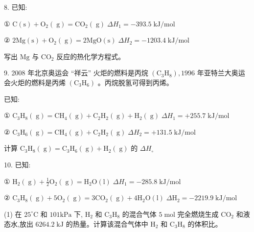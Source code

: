 \documentclass[10pt]{article}
\begin{document}
8. 已知:

① \(\mathrm{C}\left( \mathrm{s}\right) + {\mathrm{O}}_{2}\left( \mathrm{\;g}\right) = {\mathrm{{CO}}}_{2}\left( \mathrm{\;g}\right) \;\Delta {H}_{1} = - {393.5}\mathrm{\;{kJ}}/\mathrm{{mol}}\)

② \(2\mathrm{{Mg}}\left( \mathrm{s}\right) + {\mathrm{O}}_{2}\left( \mathrm{\;g}\right) = 2\mathrm{{MgO}}\left( \mathrm{s}\right) \;\Delta {H}_{2} = - {1203.4}\mathrm{\;{kJ}}/\mathrm{{mol}}\)

写出 \(\mathrm{{Mg}}\) 与 \({\mathrm{{CO}}}_{2}\) 反应的热化学方程式。

9. 2008 年北京奥运会 “祥云” 火炬的燃料是丙烷 \(\left( {{\mathrm{C}}_{3}{\mathrm{H}}_{8}}\right) ,{1996}\) 年亚特兰大奥运会火炬的燃料是丙烯 \(\left( {{\mathrm{C}}_{3}{\mathrm{H}}_{6}}\right)\) 。丙烷脱氢可得到丙烯。

已知:

① \({\mathrm{C}}_{3}{\mathrm{H}}_{8}\left( \mathrm{\;g}\right) = {\mathrm{{CH}}}_{4}\left( \mathrm{\;g}\right) + {\mathrm{C}}_{2}{\mathrm{H}}_{2}\left( \mathrm{\;g}\right) + {\mathrm{H}}_{2}\left( \mathrm{\;g}\right) \;\Delta {H}_{1} = + {255.7}\mathrm{\;{kJ}}/\mathrm{{mol}}\)

② \({\mathrm{C}}_{3}{\mathrm{H}}_{6}\left( \mathrm{\;g}\right) = {\mathrm{{CH}}}_{4}\left( \mathrm{\;g}\right) + {\mathrm{C}}_{2}{\mathrm{H}}_{2}\left( \mathrm{\;g}\right) \;\Delta {H}_{2} = + {131.5}\mathrm{\;{kJ}}/\mathrm{{mol}}\)

计算 \({\mathrm{C}}_{3}{\mathrm{H}}_{8}\left( \mathrm{\;g}\right) = {\mathrm{C}}_{3}{\mathrm{H}}_{6}\left( \mathrm{\;g}\right) + {\mathrm{H}}_{2}\left( \mathrm{\;g}\right)\) 的 \(\Delta {H}_{ \circ }\)

10. 已知:

① \({\mathrm{H}}_{2}\left( \mathrm{\;g}\right) + \frac{1}{2}{\mathrm{O}}_{2}\left( \mathrm{\;g}\right) = {\mathrm{H}}_{2}\mathrm{O}\left( \mathrm{l}\right) \;\Delta {H}_{1} = - {285.8}\mathrm{\;{kJ}}/\mathrm{{mol}}\)

② \({\mathrm{C}}_{3}{\mathrm{H}}_{8}\left( \mathrm{\;g}\right) + 5{\mathrm{O}}_{2}\left( \mathrm{\;g}\right) = 3{\mathrm{{CO}}}_{2}\left( \mathrm{\;g}\right) + 4{\mathrm{H}}_{2}\mathrm{O}\left( \mathrm{l}\right) \;\Delta {\mathrm{H}}_{2} = - {2219.9}\mathrm{\;{kJ}}/\mathrm{{mol}}\)

(1) 在 \({25}^{ \circ }\mathrm{C}\) 和 \({101}\mathrm{{kPa}}\) 下, \({\mathrm{H}}_{2}\) 和 \({\mathrm{C}}_{3}{\mathrm{H}}_{8}\) 的混合气体 \(5\mathrm{\;{mol}}\) 完全燃烧生成 \({\mathrm{{CO}}}_{2}\) 和液态水,放出 \({6264.2}\mathrm{\;{kJ}}\) 的热量。计算该混合气体中 \({\mathrm{H}}_{2}\) 和 \({\mathrm{C}}_{3}{\mathrm{H}}_{8}\) 的体积比。
\end{document}

